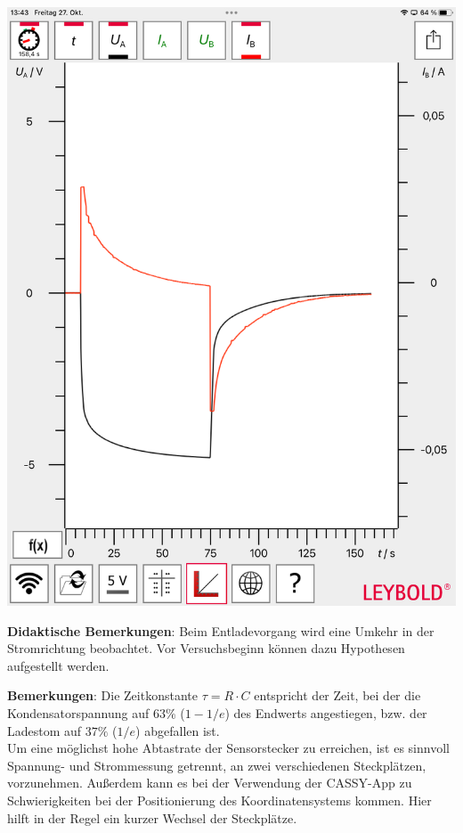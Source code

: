 \documentclass[../main.tex]{subfiles}
\begin{document}
\begin{tcolorbox}
\begin{minipage}[]{0.74\textwidth}
    
\end{minipage}
\hspace{0.05cm}    
\begin{minipage}[]{0.24\textwidth}
        \vspace{-0.2cm}
        \begin{center}
            \includegraphics[width=1\textwidth]{img/cassy}
        \end{center}
    \end{minipage}
  
    \vspace{0.5cm}
    \textbf{Didaktische Bemerkungen}: Beim Entladevorgang wird eine Umkehr in der Stromrichtung beobachtet. Vor Versuchsbeginn können dazu Hypothesen aufgestellt werden.      
    
    \vspace{0.5cm}
    \textbf{Bemerkungen}: Die Zeitkonstante $\tau=R \cdot C$ entspricht der Zeit, bei der die Kondensatorspannung auf $63 \%$ ($1-1/e$) des Endwerts angestiegen, bzw. der Ladestom auf $37 \%$ ($1/e$) abgefallen ist. \\
    Um eine möglichst hohe Abtastrate der Sensorstecker zu erreichen, ist es sinnvoll Spannung- und Strommessung getrennt, an zwei verschiedenen Steckplätzen, vorzunehmen. Außerdem kann es bei der Verwendung der CASSY-App zu Schwierigkeiten bei der Positionierung des Koordinatensystems kommen. Hier hilft in der Regel ein kurzer Wechsel der Steckplätze.
\end{tcolorbox}
\end{document}
